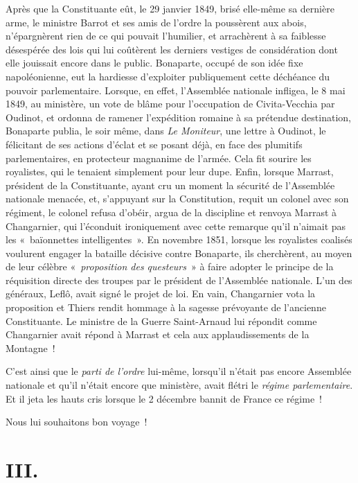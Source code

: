 \documentclass[french,twoside]{book} %
\newcommand\chapteropen{} %
\newcommand\chapterclose{} %
\begin{document}
Après que la Constituante eût, le 29 janvier 1849, brisé elle-même sa dernière arme, le ministre Barrot et ses amis de l’ordre la poussèrent aux abois, n’épargnèrent rien de ce qui pouvait l’humilier, et arrachèrent à sa faiblesse désespérée des lois qui lui coûtèrent les derniers vestiges de considération dont elle jouissait encore dans le public. Bonaparte, occupé de son idée fixe napoléonienne, eut la hardiesse d’exploiter publiquement cette déchéance du pouvoir parlementaire. Lorsque, en effet, l’Assemblée nationale infligea, le 8 mai 1849, au ministère, un vote de blâme pour l’occupation de Civita-Vecchia par Oudinot, et ordonna de ramener l’expédition romaine à sa prétendue destination, Bonaparte publia, le soir même, dans \emph{Le Moniteur}, une lettre à Oudinot, le félicitant de ses actions d’éclat et se posant déjà, en face des plumitifs parlementaires, en protecteur magnanime de l’armée. Cela fit sourire les royalistes, qui le tenaient simplement pour leur dupe. Enfin, lorsque Marrast, président de la Constituante, ayant cru un moment la sécurité de l’Assemblée nationale menacée, et, s’appuyant sur la Constitution, requit un colonel avec son régiment, le colonel refusa d’obéir, argua de la discipline et renvoya Marrast à Changarnier, qui l’éconduit ironiquement avec cette remarque qu’il n’aimait pas les « baïonnettes intelligentes ». En novembre 1851, lorsque les royalistes coalisés voulurent engager la bataille décisive contre Bonaparte, ils cherchèrent, au moyen de leur célèbre « \emph{proposition des questeurs} » à faire adopter le principe de la réquisition directe des troupes par le président de l’Assemblée nationale. L’un des généraux, Leflô, avait signé le projet de loi. En vain, Changarnier vota la proposition et Thiers rendit hommage à la sagesse prévoyante de l’ancienne Constituante. Le ministre de la Guerre Saint-Arnaud lui répondit comme Changarnier avait répond à Marrast et cela aux applaudissements de la Montagne !\par
C’est ainsi que le \emph{parti de l’ordre} lui-même, lorsqu’il n’était pas encore Assemblée nationale et qu’il n’était encore que ministère, avait flétri le \emph{régime parlementaire}. Et il jeta les hauts cris lorsque le 2 décembre bannit de France ce régime !\par
Nous lui souhaitons bon voyage !
\chapterclose


\chapteropen
\chapter[{III.}]{III.}\renewcommand{\leftmark}{III.}
\end{document}
